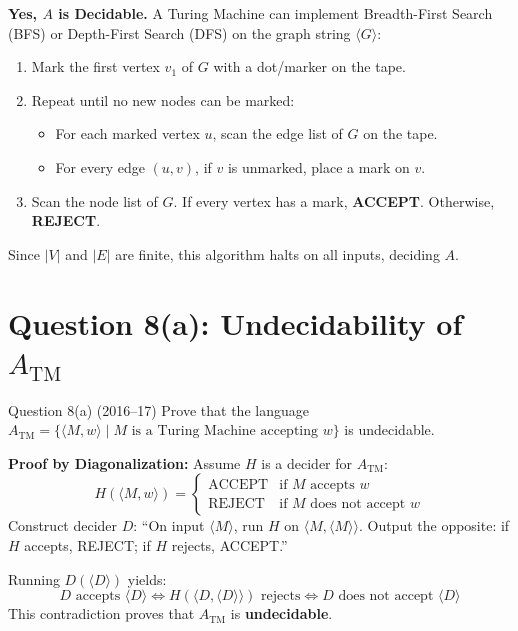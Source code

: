 \documentclass[11pt,a4paper]{article}
\begin{document}
\begin{solutionbox}
\textbf{Yes, $A$ is Decidable.}
A Turing Machine can implement Breadth-First Search (BFS) or Depth-First Search (DFS) on the graph string $\langle G \rangle$:
\begin{enumerate}[leftmargin=*]
    \item Mark the first vertex $v_1$ of $G$ with a dot/marker on the tape.
    \item Repeat until no new nodes can be marked:
    \begin{itemize}
        \item For each marked vertex $u$, scan the edge list of $G$ on the tape.
        \item For every edge $(u, v)$, if $v$ is unmarked, place a mark on $v$.
    \end{itemize}
    \item Scan the node list of $G$. If every vertex has a mark, \textbf{ACCEPT}. Otherwise, \textbf{REJECT}.
\end{enumerate}
Since $|V|$ and $|E|$ are finite, this algorithm halts on all inputs, deciding $A$.
\end{solutionbox}

\section{Question 8(a): Undecidability of $A_{\text{TM}}$}
\begin{questionbox}{Question 8(a) (2016--17)}
Prove that the language $A_{\text{TM}} = \{\langle M, w \rangle \mid M \text{ is a Turing Machine accepting } w\}$ is undecidable.
\end{questionbox}

\begin{solutionbox}
\textbf{Proof by Diagonalization:}
Assume $H$ is a decider for $A_{\text{TM}}$:
$$H(\langle M, w \rangle) = \begin{cases} \text{ACCEPT} & \text{if } M \text{ accepts } w \\ \text{REJECT} & \text{if } M \text{ does not accept } w \end{cases}$$
Construct decider $D$:
``On input $\langle M \rangle$, run $H$ on $\langle M, \langle M \rangle \rangle$. Output the opposite: if $H$ accepts, REJECT; if $H$ rejects, ACCEPT.''

Running $D(\langle D \rangle)$ yields:
$$D \text{ accepts } \langle D \rangle \iff H(\langle D, \langle D \rangle \rangle) \text{ rejects} \iff D \text{ does not accept } \langle D \rangle$$
This contradiction proves that $A_{\text{TM}}$ is \textbf{undecidable}.
\end{solutionbox}
\end{document}
